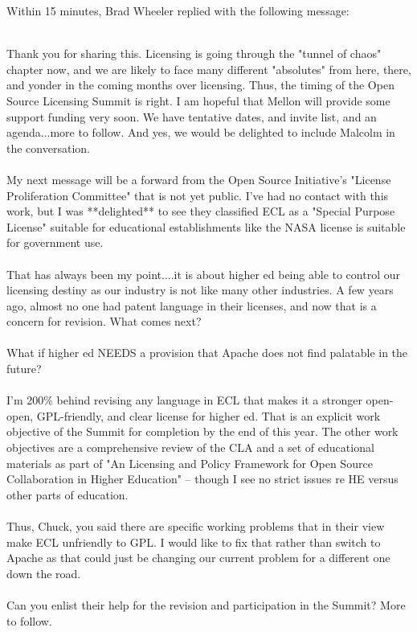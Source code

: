 \documentclass[12pt]{book}
\begin{document}
Within 15 minutes, Brad Wheeler replied with the following
message:\\
\\
\begin{sf}
Thank you for sharing this.  Licensing is going through
the "tunnel of chaos" chapter now, and we are likely
to face many different "absolutes" from here, there,
and yonder in the coming months over licensing.  Thus,
the timing of the Open Source Licensing Summit is right.
I am hopeful that Mellon will provide some support funding
very soon.  We have tentative dates, and invite list, and
an agenda...more to follow.  And yes, we would be delighted
to include Malcolm in the conversation.\\
\\
My next message will be a forward from the Open Source
Initiative's "License Proliferation Committee" that is not
yet public.  I've had no contact with this work, but I
was **delighted** to see they classified ECL as a "Special
Purpose License" suitable for educational establishments
like the NASA license is suitable for government use.\\
\\
That has always been my point....it is about higher ed
being able to control our licensing destiny as our industry
is not like many other industries. A few years ago, almost
no one had patent language in their licenses, and now that
is a concern for revision.   What comes next?\\
\\
What if higher ed NEEDS a provision that Apache does not
find palatable in the future?\\
\\
I'm 200\% behind revising any language in ECL that makes
it a stronger open-open, GPL-friendly, and clear license
for higher ed.  That is an explicit work objective of the
Summit for completion by the end of this year. The other
work objectives are a comprehensive review of the CLA
and a set of educational materials as part of "An Licensing
and Policy Framework for Open Source Collaboration in
Higher Education" -- though I see no strict issues re
HE versus other parts of education.\\
\\
Thus, Chuck, you said there are specific working problems
that in their view make ECL unfriendly to GPL.  I would
like to fix that rather than switch to Apache as that could
just be changing our current problem for a different one
down the road.\\
\\
Can you enlist their help for the revision and participation
in the Summit?  More to follow.\\
\end{sf}
\end{document}

